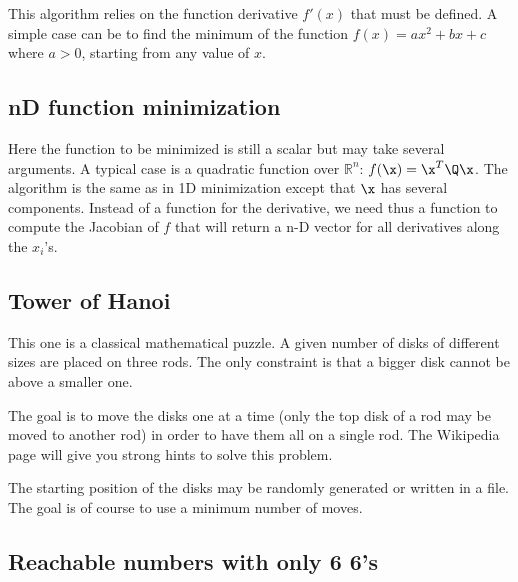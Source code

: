 \documentclass{ecnreport}
\begin{document}
This algorithm relies on the function derivative $f'(x)$ that must be defined. A simple case can be to find the minimum of the function $f(x) = ax^2+bx+c$ where $a>0$, starting from any value of $x$.

\begin{itemize}
 \end{itemize}
 
\subsection{nD function minimization}

Here the function to be minimized is still a scalar but may take several arguments. A typical case is a quadratic function over $\mathbb{R}^n$: $f(\x) = \x^T\Q\x$. The algorithm is the same as in 1D minimization except that $\x$ has several components. Instead of a function for the derivative, we need thus a function to compute the Jacobian of $f$ that will return a n-D vector for all derivatives along the $x_i$'s. 

\begin{itemize}
 \end{itemize}

 
\subsection{Tower of Hanoi}

This one is a classical mathematical puzzle.
A given number of disks of different sizes are placed on three rods.
The only constraint is that a bigger disk cannot be above a smaller one. 

The goal is to move the disks one at a time (only the top disk of a rod may be moved to another rod) in order to have them all on a single rod.
The Wikipedia page will give you strong hints to solve this problem.

The starting position of the disks may be randomly generated or written in a file. The goal is of course to use a minimum number of moves.

\begin{itemize}
 \end{itemize}
 
 \subsection{Reachable numbers with only 6 6's}
 
\end{document}
